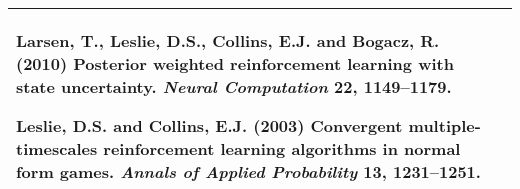 \documentclass[a4paper,11pt]{article}
\begin{document}
{\begin{tabular}{>{\raggedright}p{}p{}}
Larsen, T., Leslie, D.S., Collins, E.J. and Bogacz, R. (2010) Posterior weighted reinforcement learning with state uncertainty.  {\em Neural Computation} {\bf 22}, 1149--1179.



{Leslie, D.S.} and Collins, E.J. (2003) Convergent multiple-timescales    reinforcement learning algorithms in normal form games. {\em Annals of    Applied Probability} {\bf 13}, 1231--1251.

\\\bottomrule
\end{tabular}}
\vspace{\baselineskip}

%
%
%
%
\end{document}
